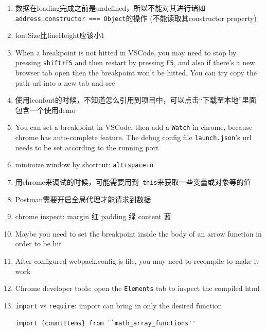 \documentclass[a4paper, 12pt]{article}
\begin{document}
\begin{enumerate}
\item 数据在loading完成之前是undefined，所以不能对其进行诸如\\ \verb|address.constructor === Object|的操作 (不能读取其constructor property)

\item fontSize比lineHeight应该小1

\item When a breakpoint is not hitted in VSCode, you may need to stop by pressing \verb|shift+F5| and then restart by pressing \verb|F5|, and also if there's a new browser tab open then the breakpoint won't be hitted. You can try copy the path url into a new tab and see

\item 使用iconfont的时候，不知道怎么引用到项目中，可以点击“下载至本地”里面包含一个使用demo

\item You can set a breakpoint in VSCode, then add a \verb|Watch| in chrome, because chrome has auto-complete feature. The debug config file \verb|launch.json|'s url needs to be set according to the running port

\item minimize window by shortcut: \verb|alt+space+n|

\item 用chrome来调试的时候，可能需要用到\verb|_this|来获取一些变量或对象等的值

\item Postman需要开启全局代理才能请求到数据

\item chrome inspect: margin 红 \quad padding 绿 \quad content 蓝

\item Maybe you need to set the breakpoint inside the body of an arrow function in order to be hit

\item After configured webpack.config.js file, you may need to recompile to make it work

\item Chrome developer tools: open the \verb|Elements| tab to inspect the compiled html

\item \verb|import| vs \verb|require|: import can bring in only the desired function
\begin{verbatim}
import {countItems} from ``math_array_functions''
\end{verbatim}


\end{enumerate}
\end{document}

